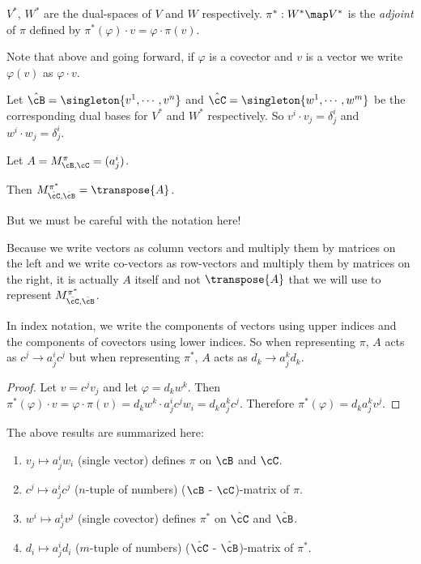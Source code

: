 \documentclass[oneside,12pt]{amsart}
\begin{document}
\begin{definition}
$V^*$, $W^*$ are the dual-spaces of $V$ and $W$ respectively.
$\pi^*:W^*\map V^*$ is the \emph{adjoint} of $\pi$ defined by
$\pi^*(\varphi) \cdot v = \varphi \cdot \pi(v)$.
\end{definition}

Note that above and going forward, if
$\varphi$ is a covector and $v$ is a vector we write $\varphi(v)$
as $\varphi \cdot v$.

Let
$\hat{\cB} = \singleton{v^1,\cdots,v^n}$ and
$\hat{\cC} = \singleton{w^1,\cdots,w^m}$ be the corresponding
dual bases for $V^*$ and $W^*$ respectively. 
So $v^i \cdot v_j = \delta^i_j$ and $w^i \cdot w_j = \delta^i_j$.

\begin{lemma}
Let $A = M^{\pi}_{\cB,\cC} =(a^i_j)$.

Then $M^{\pi^*}_{\hat{\cC},\hat{\cB}}  = \transpose{A}$.

But we must be careful with the notation here!

Because we write vectors as column vectors and multiply them by matrices on the left
and we write co-vectors as row-vectors and multiply them by matrices on the right, it
is actually $A$ itself and not $\transpose{A}$ that we will use to represent
$M^{\pi^*}_{\hat{\cC},\hat{\cB}}$.


In index notation, we write the components of vectors using upper indices and the components
of covectors using lower indices. So when representing $\pi$, $A$ acts as
$c^j \to a^i_jc^j$ but when representing $\pi^*$, $A$ acts as $d_k \to a^k_j d_k$.
\end{lemma}
\begin{proof}
Let $v=c^j v_j$ and let $\varphi = d_k w^k$. Then $\pi^*(\varphi)\cdot v = \varphi \cdot \pi(v)
= d_k w^k \cdot a^i_j c^j w_i = d_k a^k_j c ^ j$. Therefore $\pi^*(\varphi) = d_k a^k_j v^j$.
\end{proof}

\begin{remarks}
The above results are summarized here:
\begin{enumerate}
\item $v_j \mapsto a^i_j w_i$ (single vector) defines $\pi$ on  $\cB$ and $\cC$.
\item $c^j \mapsto a^i_j c ^j$ ($n$-tuple of numbers) ($\cB$ - $\cC$)-matrix of $\pi$.
\item $w^i \mapsto a^i_j v^j$ (single covector) defines $\pi^*$ on $\hat{\cC}$ and $\hat{\cB}$.
\item $d_i \mapsto a^i_j d_i$ ($m$-tuple of numbers) ($\hat{\cC}$ - $\hat{\cB}$)-matrix of $\pi^*$.
\end{enumerate}
\end{remarks}
\end{document}
